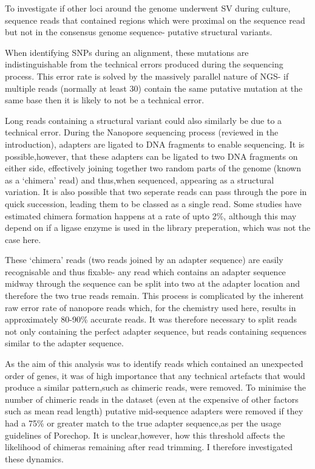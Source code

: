 
To investigate if other loci around the genome underwent SV during culture, sequence reads that contained regions which were proximal on the sequence read but not in the consensus genome sequence- putative structural variants. 


When identifying SNPs during an alignment, these mutations are indistinguishable from the technical errors produced during the sequencing process. This error rate is solved by the massively parallel nature of NGS- if multiple reads (normally at least 30) contain the same putative mutation at the same base then it is likely to not be a technical error. 

Long reads containing a structural variant could also similarly be due to a technical error. During the Nanopore sequencing process (reviewed in the introduction), adapters are ligated to DNA fragments to enable sequencing. It is possible,however, that these adapters can be ligated to two DNA fragments on either side, effectively joining together two random parts of the genome (known as a `chimera' read) and thus,when sequenced, appearing as a structural variation. It is also possible that two seperate reads can pass through the pore in quick succession, leading them to be classed as a single read. Some studies have estimated chimera formation happens at a rate of upto 2\%, although this may depend on if a ligase enzyme is used in the library preperation, which was not the case here.



These `chimera' reads (two reads joined by an adapter sequence) are easily recognisable and thus fixable- any read which contains an adapter sequence midway through the sequence can be split into two at the adapter location and therefore the two true reads remain. This process is complicated by the inherent raw error rate of nanopore reads which, for the chemistry used here, results in approximately 80-90\% accurate reads. It was therefore necessary to split reads not only containing the perfect adapter sequence, but reads containing sequences similar to the adapter sequence.

As the aim of this analysis was to identify reads which contained an unexpected order of genes, it was of high importance that any technical artefacts that would produce a similar pattern,such as chimeric reads, were removed. To minimise the number of chimeric reads in the dataset (even at the expensive of other factors such as mean read length) putative mid-sequence adapters were removed if they had a 75\% or greater match to the true adapter sequence,as per the usage guidelines of Porechop. It is unclear,however, how this threshold affects the likelihood of chimeras remaining after read trimming. I therefore investigated these dynamics.

